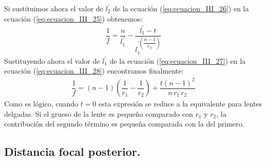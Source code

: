\documentclass[14pt]{extarticle}
\begin{document}
Si sustituimos ahora el valor de $l_{2}^{\prime}$ de la ecuación (\ref{eq:ecuacion_III_26}) en la ecuación (\ref{eq:ecuacion_III_25}) obtenemos:
\begin{align}
\dfrac{1}{f} = \dfrac{n}{l_{1}^{\prime}} - \dfrac{l_{1}^{\prime} - t}{l_{1}^{\prime \left( \dfrac{n - 1}{r_{2}} \right)}}
\label{eq:ecuacion_III_28}
\end{align}
Sustituyendo ahora el valor de $l_{1}^{\prime}$ de la ecuación (\ref{eq:ecuacion_III_27}) en la ecuación (\ref{eq:ecuacion_III_28}) encontramos finalmente:
\begin{align}
\dfrac{1}{f} = (n - 1) \left( \dfrac{1}{r_{1}} - \dfrac{1}{r_{2}} \right) + \dfrac{t (n - 1)^{2}}{n \, r_{1} \, r_{2}}
\label{eq:ecuacion_III_29}
\end{align}
Como es lógico, cuando $t = 0$ esta expresión se reduce a la equivalente para lentes delgadas. Si el grueso de la lente es pequeño comparado con $r_{1}$ y $r_{2}$, la contribución del segundo término es pequeña comparada con la del primero.

\subsection{Distancia focal posterior.}
\end{document}

